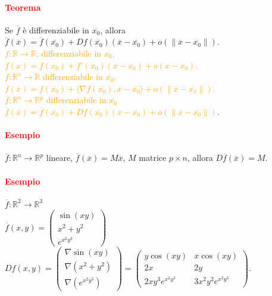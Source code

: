 \documentclass{article}
\newcommand{\R}{\mathbb{R}}
\begin{document}
\paragraph{\textcolor{red}{Teorema}}
Se $\overline{f}$ è differenziabile in $\overline{x_0}$, allora $\overline{f}(\overline{x})=\overline{f}(\overline{x_0})+Df(\overline{x_0})(\overline{x}-\overline{x_0})+o(\|\overline{x}-\overline{x_0}\|)$.\\
\textcolor{orange}{$f: \R \rightarrow \R$, differenziabile in $x_0$, $f(x)=f(x_0)+f'(x_0)(x-x_0)+o(x-x_0)$.\\
$f:\R^n \rightarrow \R$ differenziabile in $\overline{x_0}$, $f(\overline{x})=f(\overline{x_0})+\langle \nabla f(\overline{x_0}), \overline{x}-\overline{x_0} \rangle + o(\|\overline{x}-\overline{x_0} \|)$.\\
$\overline{f}: \R^n \rightarrow \R^p$ differenziabile in $\overline{x_0}$\\
$\overline{f}(\overline{x})=\overline{f}(\overline{x_0})+Df(\overline{x_0})(\overline{x}-\overline{x_0})+o(\|\overline{x}-\overline{x_0}\|)$}.

\paragraph{\textcolor{red}{Esempio}}
$\overline{f}:\R^n \rightarrow \R^p$ lineare, $\overline{f}(\overline{x})=M \overline{x}$, $M$ matrice $p \times n$, allora $D \overline{f}(\overline{x})=M$.


\paragraph{\textcolor{red}{Esempio}}
$\overline{f}:\R^2 \rightarrow \R^3$\\
$\overline{f}(x,y)=\begin{pmatrix}
    \sin(xy)\\
    x^2+y^2\\
    e^{x^2y^3}
\end{pmatrix}$\\
$Df(x,y)=\begin{pmatrix}
    \nabla \sin(xy)\\
    \nabla (x^2+y^2)\\
    \nabla (e^{x^2y^3})
\end{pmatrix}=\begin{pmatrix}
    y \cos(xy) & x \cos (xy)\\
    2x & 2y\\
    2xy^3e^{x^2y^3}&3x^2y^2e^{x^2y^3}
\end{pmatrix}$.
\end{document}
